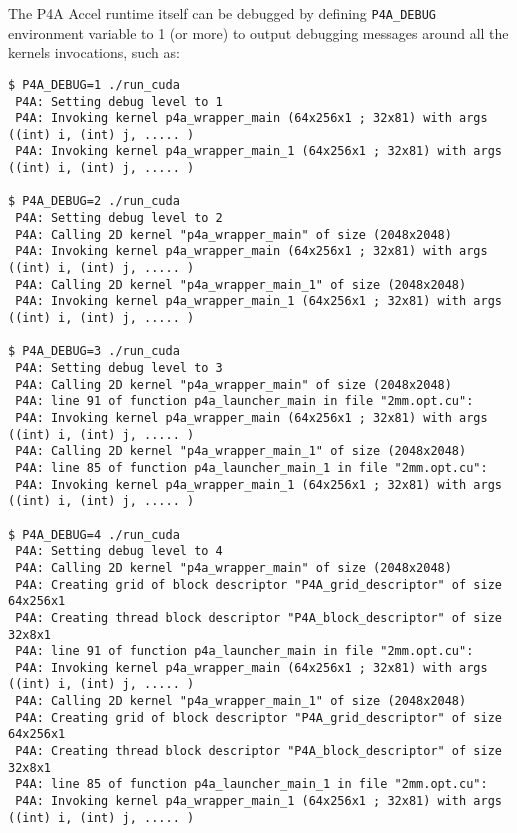 \documentclass[a4paper]{article}
\begin{document}
The P4A Accel runtime itself can be debugged by defining \verb|P4A_DEBUG| 
environment variable to 1 (or more) to output debugging messages around all
the \Acuda kernels invocations, such as: {\scriptsize
\begin{verbatim}
$ P4A_DEBUG=1 ./run_cuda
 P4A: Setting debug level to 1
 P4A: Invoking kernel p4a_wrapper_main (64x256x1 ; 32x81) with args ((int) i, (int) j, ..... )
 P4A: Invoking kernel p4a_wrapper_main_1 (64x256x1 ; 32x81) with args ((int) i, (int) j, ..... )

$ P4A_DEBUG=2 ./run_cuda
 P4A: Setting debug level to 2
 P4A: Calling 2D kernel "p4a_wrapper_main" of size (2048x2048)
 P4A: Invoking kernel p4a_wrapper_main (64x256x1 ; 32x81) with args ((int) i, (int) j, ..... )
 P4A: Calling 2D kernel "p4a_wrapper_main_1" of size (2048x2048)
 P4A: Invoking kernel p4a_wrapper_main_1 (64x256x1 ; 32x81) with args ((int) i, (int) j, ..... )

$ P4A_DEBUG=3 ./run_cuda
 P4A: Setting debug level to 3
 P4A: Calling 2D kernel "p4a_wrapper_main" of size (2048x2048)
 P4A: line 91 of function p4a_launcher_main in file "2mm.opt.cu":
 P4A: Invoking kernel p4a_wrapper_main (64x256x1 ; 32x81) with args ((int) i, (int) j, ..... )
 P4A: Calling 2D kernel "p4a_wrapper_main_1" of size (2048x2048)
 P4A: line 85 of function p4a_launcher_main_1 in file "2mm.opt.cu":
 P4A: Invoking kernel p4a_wrapper_main_1 (64x256x1 ; 32x81) with args ((int) i, (int) j, ..... )

$ P4A_DEBUG=4 ./run_cuda
 P4A: Setting debug level to 4
 P4A: Calling 2D kernel "p4a_wrapper_main" of size (2048x2048)
 P4A: Creating grid of block descriptor "P4A_grid_descriptor" of size 64x256x1
 P4A: Creating thread block descriptor "P4A_block_descriptor" of size 32x8x1
 P4A: line 91 of function p4a_launcher_main in file "2mm.opt.cu":
 P4A: Invoking kernel p4a_wrapper_main (64x256x1 ; 32x81) with args ((int) i, (int) j, ..... )
 P4A: Calling 2D kernel "p4a_wrapper_main_1" of size (2048x2048)
 P4A: Creating grid of block descriptor "P4A_grid_descriptor" of size 64x256x1
 P4A: Creating thread block descriptor "P4A_block_descriptor" of size 32x8x1
 P4A: line 85 of function p4a_launcher_main_1 in file "2mm.opt.cu":
 P4A: Invoking kernel p4a_wrapper_main_1 (64x256x1 ; 32x81) with args ((int) i, (int) j, ..... )
\end{verbatim}
}
\end{document}

